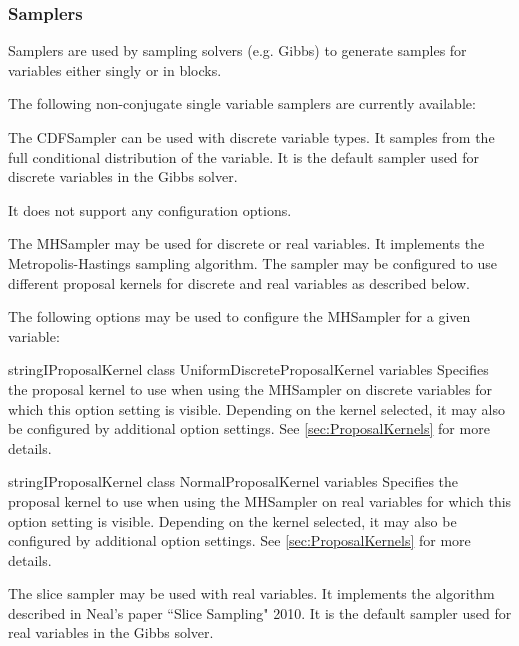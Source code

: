 \clearpage
\subsubsection{Samplers}
\label{sec:Samplers}

Samplers are used by sampling solvers (e.g. Gibbs) to generate samples for variables either singly or in blocks.

The following non-conjugate single variable samplers are currently available:

\label{sec:CDFSampler}

The CDFSampler can be used with discrete variable types. It samples from the full conditional distribution of the variable. It is the default sampler used for discrete variables in the Gibbs solver.

It does not support any configuration options.

\label{sec:MHSampler}

The MHSampler may be used for discrete or real variables. It implements the Metropolis-Hastings sampling algorithm. The sampler may be configured to use different proposal kernels for discrete and real variables as described below.

The following options may be used to configure the MHSampler for a given variable:


{\ifmatlab string\fi \ifjava IProposalKernel class\fi}
{UniformDiscreteProposalKernel}
{variables}
{Specifies the proposal kernel to use when using the MHSampler on discrete variables for which this option setting is visible. Depending on the kernel selected, it may also be configured by additional option settings. See \autoref{sec:ProposalKernels} for more details.}


{\ifmatlab string\fi \ifjava IProposalKernel class\fi}
{NormalProposalKernel}
{variables}
{Specifies the proposal kernel to use when using the MHSampler on real variables for which this option setting is visible. Depending on the kernel selected, it may also be configured by additional option settings. See \autoref{sec:ProposalKernels} for more details.}

\label{sec:SliceSampler}

The slice sampler may be used with real variables. It implements the algorithm described in Neal's paper ``Slice Sampling" 2010. It is the default sampler used for real variables in the Gibbs solver.

